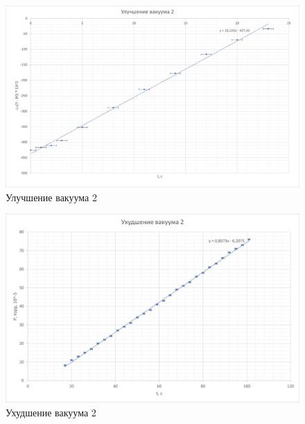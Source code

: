 \documentclass[a4paper,12pt]{article}
\theoremstyle{definition}
\begin{document}
	\centering
	\begin{figure}[h!]
		\includegraphics[scale=1.6]{IncreaseVacuum2}
		\caption{Улучшение вакуума 2}
		\label{graph3}
	\end{figure}
	
	\begin{figure}[h!]
		\includegraphics[scale=1.6]{DecreaseVacuum2}
		\caption{Ухудшение вакуума 2}
		\label{graph4}
	\end{figure}
	
\end{document}
